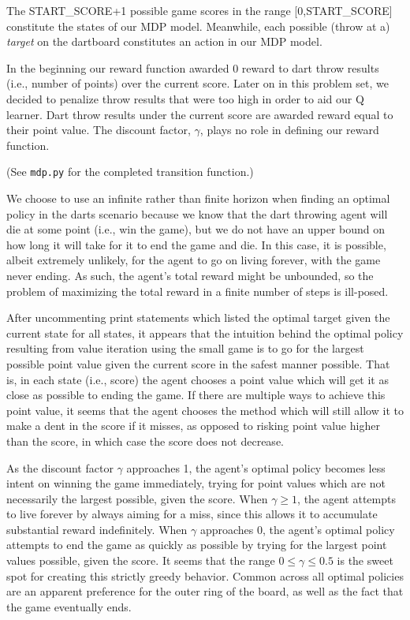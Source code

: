 \documentclass[solution, letterpaper]{cs121}
\begin{document}
\pagebreak


\subproblem{} %
The \textsc{START\_SCORE}+1 possible game scores in the range [0,\textsc{START\_SCORE}] constitute the states of our MDP model. Meanwhile, each possible (throw at a) \emph{target} on the dartboard constitutes an action in our MDP model.

\subproblem{} %
In the beginning our reward function awarded 0 reward to dart throw results (i.e., number of points) over the current score. Later on in this problem set, we decided to penalize throw results that were too high in order to aid our Q learner. Dart throw results under the current score are awarded reward equal to their point value. The discount factor, $\gamma$, plays no role in defining our reward function.

\subproblem{} %
(See {\tt mdp.py} for the completed transition function.)

\subproblem{} %
We choose to use an infinite rather than finite horizon when finding an optimal policy in the darts scenario because we know that the dart throwing agent will die at some point (i.e., win the game), but we do not have an upper bound on how long it will take for it to end the game and die. In this case, it is possible, albeit extremely unlikely, for the agent to go on living forever, with the game never ending. As such, the agent's total reward might be unbounded, so the problem of maximizing the total reward in a finite number of steps is ill-posed.

\subproblem{} %
After uncommenting print statements which listed the optimal target given the current state for all states, it appears that the intuition behind the optimal policy resulting from value iteration using the small game is to go for the largest possible point value given the current score in the safest manner possible. That is, in each state (i.e., score) the agent chooses a point value which will get it as close as possible to ending the game. If there are multiple ways to achieve this point value, it seems that the agent chooses the method which will still allow it to make a dent in the score if it misses, as opposed to risking point value higher than the score, in which case the score does not decrease.

\subproblem{} %
As the discount factor $\gamma$ approaches 1, the agent's optimal policy becomes less intent on winning the game immediately, trying for point values which are not necessarily the largest possible, given the score. When $\gamma \geq 1$, the agent attempts to live forever by always aiming for a miss, since this allows it to accumulate substantial reward indefinitely. When $\gamma$ approaches 0, the agent's optimal policy attempts to end the game as quickly as possible by trying for the largest point values possible, given the score. It seems that the range $0 \leq \gamma \leq 0.5$ is the sweet
%  
spot for creating this strictly greedy behavior. Common across all optimal policies are an apparent preference for the outer ring of the board, as well as the fact that the game eventually ends.
\end{document}
